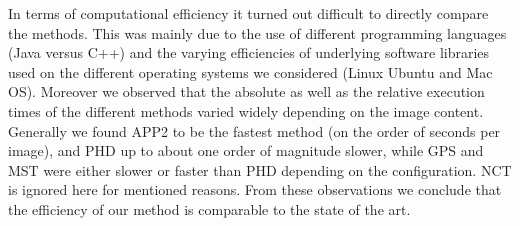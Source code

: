 In terms of computational efficiency it turned out difficult to directly compare the methods. This was mainly due to the use of different programming languages (Java versus C++) and the varying efficiencies of underlying software libraries used on the different operating systems we considered (Linux Ubuntu and Mac OS). Moreover we observed that the absolute as well as the relative execution times of the different methods varied widely depending on the image content. Generally we found APP2 to be the fastest method (on the order of seconds per image), and PHD up to about one order of magnitude slower, while GPS and MST were either slower or faster than PHD depending on the configuration. NCT is ignored here for mentioned reasons. From these observations we conclude that the efficiency of our method is comparable to the state of the art.

